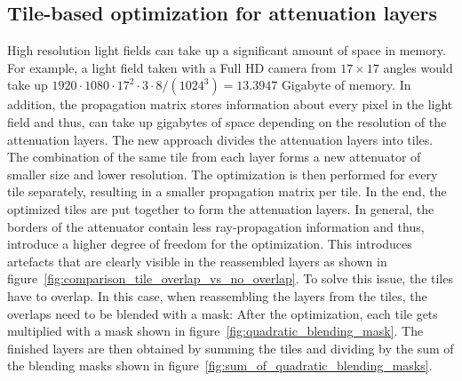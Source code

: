\documentclass[11pt,a4paper,titlepage]{article}
\begin{document}
\subsection{Tile-based optimization for attenuation layers}
High resolution light fields can take up a significant amount of space in memory. For example, a light field taken with a Full HD camera from $17\times17$ angles would take up $1920 \cdot 1080 \cdot 17^2 \cdot 3 \cdot 8 / \left(1024^3\right) = 13.3947$ Gigabyte of memory. In addition, the propagation matrix stores information about every pixel in the light field and thus, can take up gigabytes of space depending on the resolution of the attenuation layers. The new approach divides the attenuation layers into tiles. The combination of the same tile from each layer forms a new attenuator of smaller size and lower resolution. The optimization is then performed for every tile separately, resulting in a smaller propagation matrix per tile. In the end, the optimized tiles are put together to form the attenuation layers. In general, the borders of the attenuator contain less ray-propagation information and thus, introduce a higher degree of freedom for the optimization. This introduces artefacts that are clearly visible in the reassembled layers as shown in figure~\ref{fig:comparison_tile_overlap_vs_no_overlap}. To solve this issue, the tiles have to overlap. In this case, when reassembling the layers from the tiles, the overlaps need to be blended with a mask: After the optimization, each tile gets multiplied with a mask shown in figure~\ref{fig:quadratic_blending_mask}. The finished layers are then obtained by summing the tiles and dividing by the sum of the blending masks shown in figure~\ref{fig:sum_of_quadratic_blending_masks}.
\end{document}
